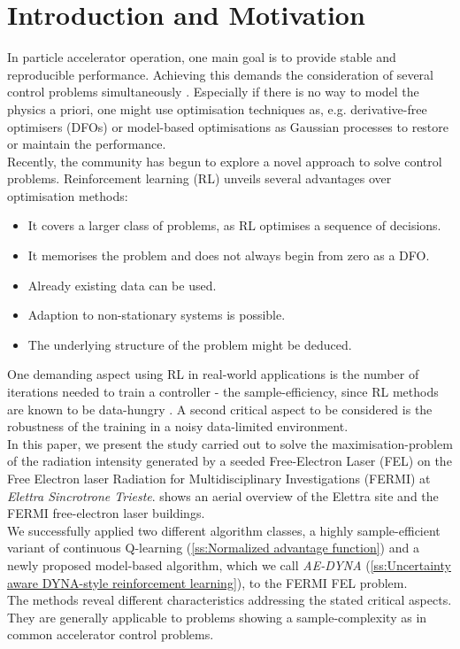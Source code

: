 \documentclass[
reprint,nofootinbib,
amsmath,amssymb,amsfonts,clevref,
aps,
prstab,
]{revtex4-2}
\begin{document}
	\section{Introduction and Motivation}
	In particle accelerator operation, one main goal is to provide stable and reproducible performance. Achieving this demands the consideration of several control problems simultaneously \cite{Kain2020,Scheinker2018}. Especially if there is no way to model the physics a priori, one might use optimisation techniques as, e.g. derivative-free optimisers (DFOs) \cite{Huang2013,Bruchon2017,Scheinker2020,Hirlaender2019,Welsch2015,Albright2019} or model-based optimisations as Gaussian processes \cite{Hanuka2020,Roussel2020} to restore or maintain the performance.\\
	Recently, the community has begun to explore a novel approach to solve control problems. Reinforcement learning (RL) \cite{Bruchon2020,Bruchon2019,Kain2020,Pang2020,John2020} unveils several advantages over optimisation methods:
	\begin{itemize}
		\item It covers a larger class of problems, as RL optimises a sequence of decisions.
		\item It memorises the problem and does not always begin from zero as a DFO.
		\item Already existing data can be used.
		\item Adaption to non-stationary systems is possible.
		\item The underlying structure of the problem might be deduced.
	\end{itemize}
	One demanding aspect using RL in real-world applications is the number of iterations needed to train a controller - the sample-efficiency, since RL methods are known to be data-hungry \cite{Sutton2018,DulacArnold2019}. A second critical aspect to be considered is the robustness of the training in a noisy data-limited environment.\\
	In this paper, we present the study carried out to solve the maximisation-problem of the radiation intensity generated by a seeded Free-Electron Laser (FEL) on the Free Electron laser Radiation for Multidisciplinary Investigations (FERMI) at \emph{Elettra Sincrotrone Trieste}.  shows an aerial
	overview of the Elettra site and the FERMI free-electron laser buildings.\\
	We successfully applied two different algorithm classes, a highly sample-efficient variant of continuous Q-learning (\cref{ss:Normalized advantage function}) and a newly proposed model-based algorithm, which we call \emph{AE-DYNA} (\cref{ss:Uncertainty aware DYNA-style reinforcement learning}), to the FERMI FEL problem.\\ The methods reveal different characteristics addressing the stated critical aspects. They are generally applicable to problems showing a sample-complexity as in common accelerator control problems.
\end{document}
